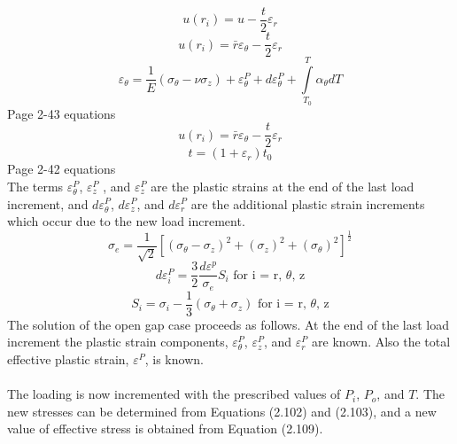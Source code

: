 \documentclass[12pt]{article}
\begin{document}
\begin{equation}
u(r_i)=u-\frac{t}{2} \varepsilon_r
\end{equation}
\begin{equation}
u(r_i)= \bar{r} \varepsilon_{\theta}-\frac{t}{2} \varepsilon_r
\end{equation}
\begin{equation}
\varepsilon_{\theta}=\frac{1}{E} \left( \sigma_{\theta}-\nu\sigma_{z}\right)+\varepsilon_{\theta}^P+d\varepsilon_{\theta}^P+\int\limits_{T_0}^T \alpha_{\theta} dT
\end{equation}
Page 2-43 equations
\begin{equation}
u(r_i)= \bar{r} \varepsilon_{\theta}-\frac{t}{2} \varepsilon_r
\end{equation}
\begin{equation}
t = \left( 1 + \varepsilon_r \right) t_0
\end{equation}
Page 2-42 equations \\
The terms  $\varepsilon_{\theta}^P$, $\varepsilon_{z}^P$ , and $\varepsilon_{z}^P$  are the plastic strains at the end of the last load increment, and $d\varepsilon_{\theta}^P$, $d\varepsilon_{z}^P$, and $d\varepsilon_{r}^P$ are the additional plastic strain increments which occur due to the new load increment.
\begin{equation}
\sigma_e=\frac{1}{\sqrt{2}} \left[ (\sigma_{\theta}-\sigma_{z})^2+(\sigma_{z})^2+(\sigma_{\theta})^2 \right] ^{\frac{1}{2}}
\end{equation}
\begin{equation}
d\varepsilon_i^P = \frac{3}{2} \frac{d\varepsilon^p}{\sigma_e}S_i \text{ for i = r, }\theta\text{, z}
\end{equation}
\begin{equation}
S_i=\sigma_i-\frac{1}{3}(\sigma_{\theta}+\sigma_{z}) \text{ for i = r, }\theta\text{, z}
\end{equation}
The solution of the open gap case proceeds as follows. At the end of the last load increment the plastic strain components, $\varepsilon_{\theta}^P$, $\varepsilon_{z}^P$, and $\varepsilon_{r}^P$  are known. Also the total effective plastic strain, $\varepsilon^P$, is known. \\
\\
The loading is now incremented with the prescribed values of $P_i$, $P_o$, and $T$. The new stresses can be determined from Equations (2.102) and (2.103), and a new value of effective stress is obtained from Equation (2.109). \\
\end{document}
